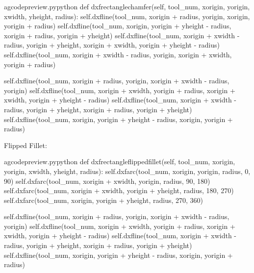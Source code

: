 \documentclass{ltxdoc}
\begin{document}
\lstset{firstnumber=\thegcpy}
\begin{writecode}{a}{gcodepreview.py}{python}
    def dxfrectanglechamfer(self, tool_num, xorigin, yorigin, xwidth, yheight, radius):
        self.dxfline(tool_num, xorigin + radius, yorigin, xorigin, yorigin + radius)
        self.dxfline(tool_num, xorigin, yorigin + yheight - radius, xorigin + radius, yorigin + yheight)
        self.dxfline(tool_num, xorigin + xwidth - radius, yorigin + yheight, xorigin + xwidth, yorigin + yheight - radius)
        self.dxfline(tool_num, xorigin + xwidth - radius, yorigin, xorigin + xwidth, yorigin + radius)

        self.dxfline(tool_num, xorigin + radius, yorigin, xorigin + xwidth - radius, yorigin)
        self.dxfline(tool_num, xorigin + xwidth, yorigin + radius, xorigin + xwidth, yorigin + yheight - radius)
        self.dxfline(tool_num, xorigin + xwidth - radius, yorigin + yheight, xorigin + radius, yorigin + yheight)
        self.dxfline(tool_num, xorigin, yorigin + yheight - radius, xorigin, yorigin + radius)

\end{writecode}
\addtocounter{gcpy}{11}

Flipped Fillet:

\lstset{firstnumber=\thegcpy}
\begin{writecode}{a}{gcodepreview.py}{python}
    def dxfrectangleflippedfillet(self, tool_num, xorigin, yorigin, xwidth, yheight, radius):
        self.dxfarc(tool_num, xorigin, yorigin, radius,  0, 90)
        self.dxfarc(tool_num, xorigin + xwidth, yorigin, radius, 90, 180)
        self.dxfarc(tool_num, xorigin + xwidth, yorigin + yheight, radius, 180, 270)
        self.dxfarc(tool_num, xorigin, yorigin + yheight, radius, 270, 360)

        self.dxfline(tool_num, xorigin + radius, yorigin, xorigin + xwidth - radius, yorigin)
        self.dxfline(tool_num, xorigin + xwidth, yorigin + radius, xorigin + xwidth, yorigin + yheight - radius)
        self.dxfline(tool_num, xorigin + xwidth - radius, yorigin + yheight, xorigin + radius, yorigin + yheight)
        self.dxfline(tool_num, xorigin, yorigin + yheight - radius, xorigin, yorigin + radius)

\end{writecode}
\addtocounter{gcpy}{11}
\end{document}
